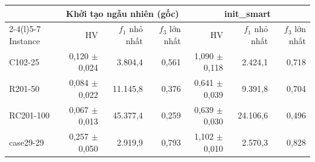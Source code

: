 \begin{tabular}{@{}lrrrrrr@{}}
\toprule
 & \multicolumn{3}{c}{Khởi tạo ngẫu nhiên (gốc)} & \multicolumn{3}{c}{init\_smart} \\
\cmidrule(lr){2-4}\cmidrule(l){5-7}
Instance & HV & $f_1$ nhỏ nhất & $f_3$ lớn nhất & HV & $f_1$ nhỏ nhất & $f_3$ lớn nhất \\
\midrule
C102-25 & 0{,}120 $\pm$ 0{,}024 & 3.804{,}4 & 0{,}561 & 1{,}090 $\pm$ 0{,}118 & 2.424{,}1 & 0{,}718 \\
R201-50 & 0{,}084 $\pm$ 0{,}022 & 11.145{,}8 & 0{,}376 & 0{,}641 $\pm$ 0{,}039 & 9.391{,}8 & 0{,}704 \\
RC201-100 & 0{,}067 $\pm$ 0{,}013 & 45.377{,}4 & 0{,}259 & 0{,}639 $\pm$ 0{,}030 & 24.106{,}6 & 0{,}496 \\
case29-29 & 0{,}257 $\pm$ 0{,}050 & 2.919{,}9 & 0{,}793 & 1{,}102 $\pm$ 0{,}010 & 2.570{,}3 & 0{,}828 \\
\bottomrule
\end{tabular}
